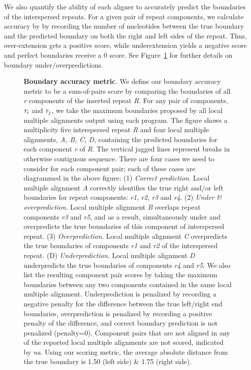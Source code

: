 \documentclass{llncs}
\begin{document}
We also quantify the ability of each aligner to accurately predict the
boundaries of the interspersed repeats.  For a given pair of repeat components, we calculate accuracy by
by recording the number of nucleotides between the true boundary and the predicted boundary
on both the right and left sides of the repeat.  Thus, over-extension gets a positive score, while underextension
yields a negative score and perfect boundaries receive a 0 score. See Figure~\ref{fig-overunder} for
further details on boundary under/overpredictions.

\begin{figure}[t]
\centering
{}
\caption{\textbf{Boundary accuracy metric}. \scriptsize We define our boundary accuracy metric to be a sum-of-pairs score by comparing the boundaries of all \emph{r} components of the inserted repeat \emph{R}. For any pair of components, $\emph{r}_{i}$ and $\emph{r}_{j}$, we take the maximum boundaries proposed by all local multiple alignments output using each program. The figure shows a multiplicity five interspersed repeat \emph{R} and four local multiple alignments, \emph{A, B, C, D}, containing the predicted boundaries for each component \emph{r} of \emph{R}. The vertical jagged lines represent breaks in otherwise contiguous sequence. There are four cases we need to consider for each component pair; each of these cases are diagrammed in the above figure: (1) \emph{Correct prediction}. Local multiple alignment {\emph{A}} correctly identifies the true right and/or left boundaries for repeat components: \emph{r1}, \emph{r2}, \emph{r3} and \emph{r4}. (2) \emph{Under \& overprediction}. Local multiple alignment \emph{B} overlaps repeat components \emph{r3} and \emph{r5}, and as a result, simultaneously under and overpredicts the true boundaries of this component of interspersed repeat. (3) \emph{Overprediction}. Local multiple alignment \emph{C} overpredicts the true boundaries of components \emph{r1} and \emph{r2} of the interspersed repeat. (D) \emph{Underprediction}. Local multiple alignment \emph{D} underpredicts the true boundaries of components \emph{r4} and \emph{r5}.
We also list the resulting component pair scores by taking the maximum boundaries between any two components contained in the same local multiple alignment. Underprediction is penalized by recording a negative penalty for the difference between the true left/right end boundaries, overprediction is penalized by recording a positive penalty of the difference, and correct boundary prediction is not penalized (penalty=0). Component pairs that are not aligned in any of the reported local multiple alignments are not scored, indicated by \emph{na}. Using our scoring metric, the average absolute distance from the true boundary is 1.50 (left side) \& 1.75 (right side).  }
\label{fig-overunder}
\end{figure}
\end{document}
